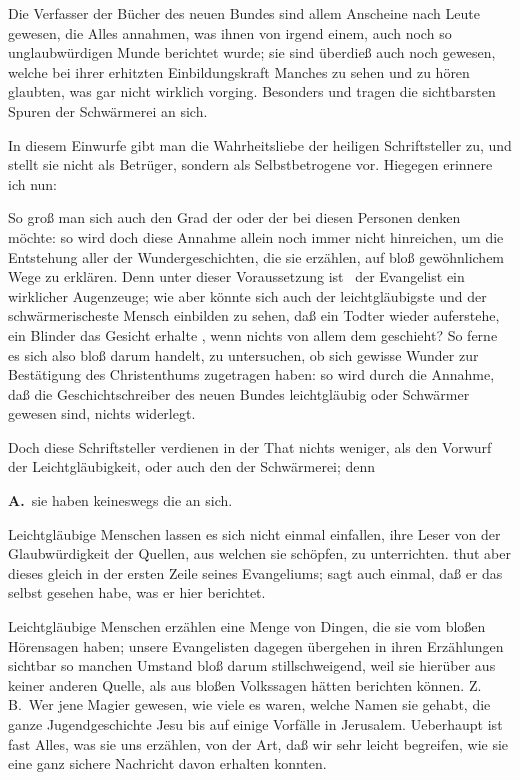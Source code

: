  Die Verfasser der Bücher des neuen Bundes sind allem Anscheine nach  Leute gewesen, die Alles annahmen, was ihnen von irgend einem, auch noch so unglaubwürdigen Munde berichtet wurde; sie sind überdieß auch noch  gewesen, welche bei ihrer erhitzten Einbildungskraft Manches zu sehen und zu hören glaubten, was gar nicht wirklich vorging. Besonders  und  tragen die sichtbarsten Spuren der Schwärmerei an sich.\par
{} In diesem Einwurfe gibt man die Wahrheitsliebe der heiligen Schriftsteller zu, und stellt sie nicht als Betrüger, sondern als Selbstbetrogene vor. Hiegegen erinnere ich nun:
\begin{aufza}
\item So groß man sich auch den Grad der  oder der  bei diesen Personen denken möchte: so wird doch diese Annahme allein noch immer nicht hinreichen, um die Entstehung aller der Wundergeschichten, die sie erzählen, auf bloß gewöhnlichem Wege zu erklären. Denn unter dieser Voraussetzung ist \zB\ der Evangelist  ein wirklicher Augenzeuge; wie aber könnte sich auch der leichtgläubigste und der schwärmerischeste Mensch einbilden zu sehen, daß ein Todter wieder auferstehe, ein Blinder das Gesicht erhalte \usw, wenn nichts von allem dem geschieht? So ferne es sich also bloß darum handelt, zu untersuchen, ob sich gewisse Wunder zur Bestätigung des Christenthums zugetragen haben: so wird durch die Annahme, daß die Geschichtschreiber des neuen Bundes leichtgläubig oder Schwärmer gewesen sind, nichts widerlegt.
\item Doch diese Schriftsteller verdienen in der That nichts weniger, als den Vorwurf der Leichtgläubigkeit, oder auch den der Schwärmerei; denn\par

\vabst \textbf{A.}~sie haben keineswegs die  an sich.
\begin{aufzb}
\item Leichtgläubige Menschen lassen es sich nicht einmal einfallen, ihre Leser von der Glaubwürdigkeit der Quellen, aus welchen sie schöpfen, zu unterrichten.  thut aber dieses gleich in der ersten Zeile seines Evangeliums;  sagt auch einmal, daß er das selbst gesehen habe, was er hier berichtet.
\item Leichtgläubige Menschen erzählen eine Menge von Dingen, die sie vom bloßen Hörensagen haben; unsere Evangelisten dagegen übergehen in ihren Erzählungen sichtbar so manchen Umstand bloß darum stillschweigend, weil sie hierüber aus keiner anderen Quelle, als aus bloßen Volkssagen hätten berichten können. Z.\,B.\ Wer jene Magier gewesen, wie viele es waren, welche Namen sie gehabt, die ganze Jugendgeschichte Jesu bis auf einige Vorfälle in Jerusalem. Ueberhaupt ist fast Alles, was sie uns erzählen, von der Art, daß wir sehr leicht begreifen, wie sie eine ganz sichere Nachricht davon erhalten konnten.
\end{aufzb}\par


\end{aufza}
